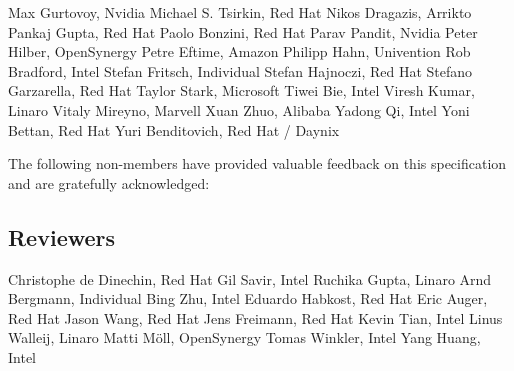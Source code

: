 Max Gurtovoy, Nvidia \newline
Michael S. Tsirkin, Red Hat \newline
Nikos Dragazis, Arrikto \newline
Pankaj Gupta, Red Hat \newline
Paolo Bonzini, Red Hat \newline
Parav Pandit, Nvidia \newline
Peter Hilber, OpenSynergy \newline
Petre Eftime, Amazon \newline
Philipp Hahn, Univention \newline
Rob Bradford, Intel \newline
Stefan Fritsch, Individual \newline
Stefan Hajnoczi, Red Hat \newline
Stefano Garzarella, Red Hat \newline
Taylor Stark, Microsoft \newline
Tiwei Bie, Intel \newline
Viresh Kumar, Linaro \newline
Vitaly Mireyno, Marvell \newline
Xuan Zhuo, Alibaba \newline
Yadong Qi, Intel \newline
Yoni Bettan, Red Hat \newline
Yuri Benditovich, Red Hat / Daynix \newline

The following non-members have provided valuable feedback on this
specification and are gratefully acknowledged:

\subsection*{Reviewers}
Christophe de Dinechin, Red Hat \newline
Gil Savir, Intel \newline
Ruchika Gupta, Linaro \newline
Arnd Bergmann, Individual \newline
Bing Zhu, Intel \newline
Eduardo Habkost, Red Hat \newline
Eric Auger, Red Hat \newline
Jason Wang, Red Hat \newline
Jens Freimann, Red Hat \newline
Kevin Tian, Intel \newline
Linus Walleij, Linaro \newline
Matti Möll, OpenSynergy \newline
Tomas Winkler, Intel \newline
Yang Huang, Intel \newline


